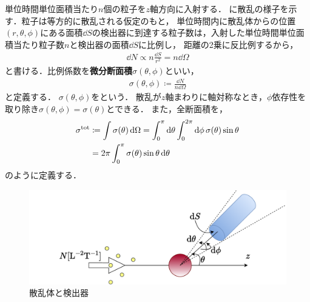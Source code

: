 \documentclass{report}
\begin{document}
  単位時間単位面積当たり$n$個の粒子を$z$軸方向に入射する．
  に散乱の様子を示す．粒子は等方的に散乱される仮定のもと，
  単位時間内に散乱体からの位置$(r,\theta,\phi)$にある面積$\dd{S}$の検出器に到達する粒子数は，入射した単位時間単位面積当たり粒子数$n$と検出器の面積$\dd{S}$に比例し，
  距離の2乗に反比例するから，
  \begin{align}
    \dd{N} \propto n \frac{\dd{S}}{r^2} = n\dd{\Omega}
  \end{align}
  と書ける．比例係数を\textbf{微分断面積}$\sigma (\theta, \phi)$といい，
  \begin{align}
    \sigma(\theta, \phi) \coloneqq \frac{\dd{N}}{n \dd{\Omega}}\label{differential-cross-section-def}
  \end{align}
  と定義する．
  $\sigma(\theta, \phi)$をという．
  散乱が$z$軸まわりに軸対称なとき，$\phi$依存性を取り除き$\sigma(\theta, \phi) = \sigma (\theta)$とできる．
  また，全断面積を，
  \begin{align}
    \sigma^{\mathrm{tot}} &\coloneqq \int \sigma(\theta) \dd{\Omega} = \int_{0}^{\pi}\dd{\theta}\int_{0}^{2\pi}\dd{\phi}\sigma(\theta) \sin\theta \\ 
    &= 2\pi \int_{0}^{\pi} \sigma(\theta) \sin \theta \dd{\theta}\label{total-area}
  \end{align}
  のように定義する．
  \begin{figure}[H]
    \centering
    \includegraphics[width = 0.6\columnwidth]{fig/scattering_diagram.pdf}
    \caption{散乱体と検出器}\label{scattering_detection}
  \end{figure}
\end{document}
